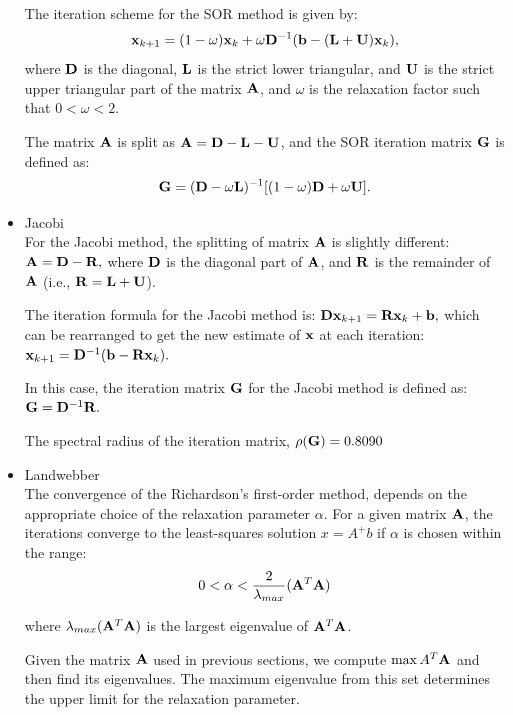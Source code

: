 \begin{itemize}
    The iteration scheme for the SOR method is given by:
    $$ \mathbf{x}_{k+1} = (1-\omega)\mathbf{x}_k + \omega \mathbf{D}^{-1}(\mathbf{b} - (\mathbf{L} + \mathbf{U})\mathbf{x}_k), $$
    where $ \mathbf{D} $ is the diagonal, $ \mathbf{L} $ is the strict lower triangular, and $ \mathbf{U} $ is the strict upper triangular part of the matrix $ \mathbf{A} $, and $ \omega $ is the relaxation factor such that $ 0 < \omega < 2 $.

    The matrix $ \mathbf{A} $ is split as $ \mathbf{A} = \mathbf{D} - \mathbf{L} - \mathbf{U} $, and the SOR iteration matrix $ \mathbf{G}$ is defined as:
    $$ \mathbf{G}  = (\mathbf{D} - \omega \mathbf{L})^{-1}[(1-\omega)\mathbf{D} + \omega \mathbf{U}]. $$

  \item Jacobi \\
  
    For the Jacobi method, the splitting of matrix $ \mathbf{A} $ is slightly different:
    $ \mathbf{A} = \mathbf{D} - \mathbf{R}, $
    where $ \mathbf{D} $ is the diagonal part of $ \mathbf{A} $, and $ \mathbf{R} $ is the remainder of $ \mathbf{A} $ (i.e., $ \mathbf{R} = \mathbf{L} + \mathbf{U} $).

    The iteration formula for the Jacobi method is:
    $ \mathbf{Dx}_{k+1} = \mathbf{Rx}_k + \mathbf{b}, $
    which can be rearranged to get the new estimate of $ \mathbf{x} $ at each iteration:
    $ \mathbf{x}_{k+1} = \mathbf{D}^{-1}(\mathbf{b} - \mathbf{Rx}_k). $

    In this case, the iteration matrix $ \mathbf{G} $ for the Jacobi method is defined as:
    $ \mathbf{G} = \mathbf{D}^{-1}\mathbf{R}. $

    The spectral radius of the iteration matrix, $ \rho(\mathbf{G}) = 0.8090$

  \item Landwebber \\
  
  The convergence of the Richardson's first-order method, depends on the appropriate choice of the relaxation parameter \( \alpha \). 
  For a given matrix $\mathbf{A}$, the iterations converge to the least-squares solution \( x = A^+b \) if \( \alpha \) is chosen within the range:
  \begin{equation*}
    0 < \alpha < \frac{2}{\lambda_{max}}(\mathbf{A}^T\mathbf{A}) 
  \end{equation*}

  where  $\lambda_{max}(\mathbf{A}^T\mathbf{A})$ is the largest eigenvalue of $ \mathbf{A}^T\mathbf{A} $.

  Given the matrix $\mathbf{A}$ used in previous sections, we compute $\max{A}^T\mathbf{A}$ and then find its eigenvalues. 
  The maximum eigenvalue from this set determines the upper limit for the relaxation parameter. 
  

\end{itemize}
